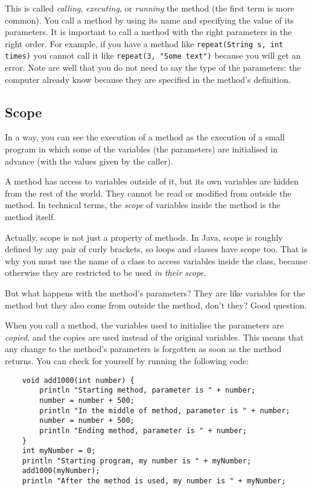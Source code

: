 This is called \emph{calling}, \emph{executing}, or \emph{running} the
method (the first term is more common). 
You call a method by using its name and specifying the value of its
parameters. 
It is important to call a
method with the right parameters in the right order. For example, if
you have a method like \verb+repeat(String s, int times)+ you 
cannot call it like \verb+repeat(3, "Some text")+ because you will get
an error. Note are well that you do not need to say the type of the
parameters: the computer already know because they are specified in
the method's definition. 

\subsection{Scope}

In a way, you can see the execution of a method as the execution of a
small program in which some of the variables (the parameters) are
initialised in advance (with the values given by the caller). 

A method has access to variables outside of it, but its own variables
are hidden from the rest of the world. They cannot be read or modified
from outside the method. In technical terms, the \emph{scope} of
variables inside the method is the method itself. 

Actually, scope is not just a property of methods. In Java, scope is
roughly defined by any pair of curly brackets, so loops and classes
have scope too. That is why you must use the name of a class to access
variables inside the class, because otherwise they are restricted to
be used \emph{in their scope}. 

But what happens with the method's parameters? They are like variables
for the method but they also come from outside the method, don't they?
Good question. 

When you call a method, the variables used to initialise the
parameters are \emph{copied}, and the copies are used instead of the
original variables. This means that any change to the method's
parameters is forgotten as soon as the method returns. You can check
for yourself by running the following code: 

\begin{verbatim}
    void add1000(int number) {
        println "Starting method, parameter is " + number;
        number = number + 500;
        println "In the middle of method, parameter is " + number;
        number = number + 500;
        println "Ending method, parameter is " + number;
    }
    int myNumber = 0;
    println "Starting program, my number is " + myNumber;
    add1000(myNumber);
    println "After the method is used, my number is " + myNumber;
\end{verbatim}

